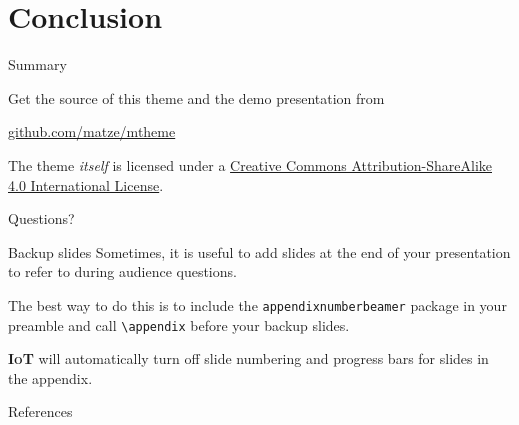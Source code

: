 \documentclass[10pt]{beamer}
\newcommand{\themename}{\textbf{\textsc{IoT}}\xspace}
\begin{document}
\section{Conclusion}

\begin{frame}{Summary}

  Get the source of this theme and the demo presentation from

  \begin{center}\url{github.com/matze/mtheme}\end{center}

  The theme \emph{itself} is licensed under a
  \href{http://creativecommons.org/licenses/by-sa/4.0/}{Creative Commons
  Attribution-ShareAlike 4.0 International License}.

  \begin{center}\ccbysa\end{center}

\end{frame}

\begin{frame}[standout]
  Questions?
\end{frame}

\appendix

\begin{frame}[fragile]{Backup slides}
  Sometimes, it is useful to add slides at the end of your presentation to
  refer to during audience questions.

  The best way to do this is to include the \verb|appendixnumberbeamer|
  package in your preamble and call \verb|\appendix| before your backup slides.

  \themename will automatically turn off slide numbering and progress bars for
  slides in the appendix.
\end{frame}

\begin{frame}[allowframebreaks]{References}

  
  

\end{frame}
\end{document}
